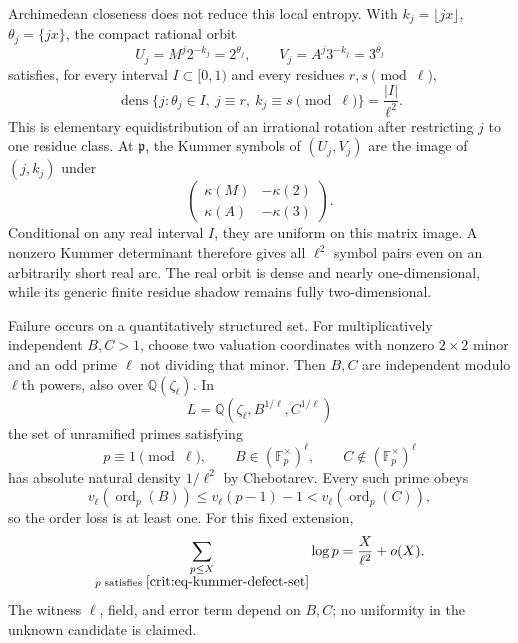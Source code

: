 \documentclass[11pt,oneside]{article}
\theoremstyle{definition}
\theoremstyle{remark}
\newcommand{\Q}{\mathbb Q}
\begin{document}
Archimedean closeness does not reduce this local entropy.  With
$k_j=\lfloor jx\rfloor$, $\theta_j=\{jx\}$, the compact rational orbit
\[
 U_j=M^j2^{-k_j}=2^{\theta_j},\qquad
 V_j=A^j3^{-k_j}=3^{\theta_j}
\]
satisfies, for every interval $I\subset[0,1)$ and every residues $r,s\pmod\ell$,
\begin{equation}
 \operatorname{dens}\{j:\theta_j\in I,\ j\equiv r,\ k_j\equiv s\pmod\ell\}
 =\frac{|I|}{\ell^2}.
 \label{crit:eq-carry-phase-equidistribution}
\end{equation}
This is elementary equidistribution of an irrational rotation after restricting $j$ to one
residue class.  At $\mathfrak p$, the Kummer symbols of $(U_j,V_j)$ are the image of
$(j,k_j)$ under
\begin{equation}
 \begin{pmatrix}\kappa(M)&-\kappa(2)\\
                 \kappa(A)&-\kappa(3)\end{pmatrix}.
 \label{crit:eq-mantissa-symbol-map}
\end{equation}
Conditional on any real interval $I$, they are uniform on this matrix image.  A nonzero
Kummer determinant therefore gives all $\ell^2$ symbol pairs even on an arbitrarily short
real arc.  The real orbit is dense and nearly one-dimensional, while its generic finite
residue shadow remains fully two-dimensional.

Failure occurs on a quantitatively structured set.  For multiplicatively independent
$B,C>1$, choose two valuation coordinates with nonzero $2\times2$ minor and an odd prime
$\ell$ not dividing that minor.  Then $B,C$ are independent modulo $\ell$th powers, also
over $\Q(\zeta_\ell)$.  In
\[
 L=\Q(\zeta_\ell,B^{1/\ell},C^{1/\ell})
\]
the set of unramified primes satisfying
\begin{equation}
 p\equiv1\pmod\ell,\qquad
 B\in(\mathbb F_p^\times)^\ell,\qquad
 C\notin(\mathbb F_p^\times)^\ell
 \label{crit:eq-kummer-defect-set}
\end{equation}
has absolute natural density $1/\ell^2$ by Chebotarev.  Every such prime obeys
\[
 v_\ell(\operatorname{ord}_p(B))
 \le v_\ell(p-1)-1
 <v_\ell(\operatorname{ord}_p(C)),
\]
so the order loss is at least one.  For this fixed extension,
\begin{equation}
 \sum_{\substack{p\le X\\p\text{ satisfies }\eqref{crit:eq-kummer-defect-set}}}
 \log p=\frac{X}{\ell^2}+o(X).
 \label{crit:eq-kummer-weighted-primes}
\end{equation}
The witness $\ell$, field, and error term depend on $B,C$; no uniformity in the unknown
candidate is claimed.
\end{document}
